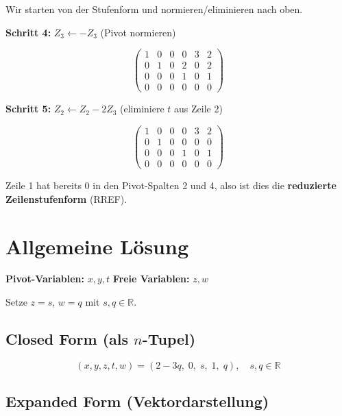 \documentclass[a4paper,12pt]{article}
\begin{document}
Wir starten von der Stufenform und normieren/eliminieren nach oben.

\textbf{Schritt 4:} $Z_3 \leftarrow -Z_3$ (Pivot normieren)

\[
\left(\begin{array}{ccccc|c}
1 & 0 & 0 & 0 & 3 & 2 \\
0 & 1 & 0 & 2 & 0 & 2 \\
0 & 0 & 0 & 1 & 0 & 1 \\
0 & 0 & 0 & 0 & 0 & 0
\end{array}\right)
\]

\textbf{Schritt 5:} $Z_2 \leftarrow Z_2 - 2Z_3$ (eliminiere $t$ aus Zeile 2)

\[
\left(\begin{array}{ccccc|c}
1 & 0 & 0 & 0 & 3 & 2 \\
0 & 1 & 0 & 0 & 0 & 0 \\
0 & 0 & 0 & 1 & 0 & 1 \\
0 & 0 & 0 & 0 & 0 & 0
\end{array}\right)
\]

Zeile 1 hat bereits 0 in den Pivot-Spalten 2 und 4, also ist dies die \textbf{reduzierte Zeilenstufenform} (RREF).

\section*{Allgemeine Lösung}

\textbf{Pivot-Variablen:} $x, y, t$ \quad \textbf{Freie Variablen:} $z, w$

Setze $z = s$, $w = q$ mit $s, q \in \mathbb{R}$.

\subsection*{Closed Form (als $n$-Tupel)}

\[
\boxed{(x,y,z,t,w) = (2-3q,\; 0,\; s,\; 1,\; q), \quad s, q \in \mathbb{R}}
\]

\subsection*{Expanded Form (Vektordarstellung)}
\end{document}
